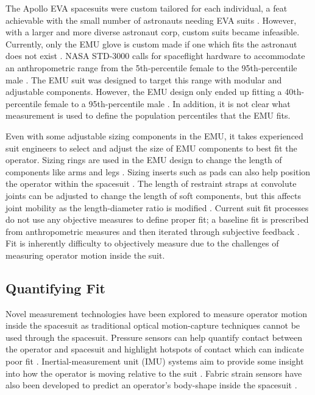 \documentclass[defaultstyle,11pt]{comps}
\begin{document}
The Apollo EVA spacesuits were custom tailored for each individual, a feat achievable with the small number of astronauts needing EVA suits \citep{Harris2001}.
However, with a larger and more diverse astronaut corp, custom suits became infeasible.
Currently, only the EMU glove is custom made if one which fits the astronaut does not exist \citep{Chappell2017}.
NASA STD-3000 calls for spaceflight hardware to accommodate an anthropometric range from the 5th-percentile female to the 95th-percentile male \citep{NASA1995}.
The EMU suit was designed to target this range with modular and adjustable components.
However, the EMU design only ended up fitting a 40th-percentile female to a 95th-percentile male \citep{Kim2019}.
In addition, it is not clear what measurement is used to define the population percentiles that the EMU fits.

Even with some adjustable sizing components in the EMU, it takes experienced suit engineers to select and adjust the size of EMU components to best fit the operator.
Sizing rings are used in the EMU design to change the length of components like arms and legs \citep{Harris2001}.
Sizing inserts such as pads can also help position the operator within the spacesuit \citep{Chappell2017}.
The length of restraint straps at convolute joints can be adjusted to change the length of soft components, but this affects joint mobility as the length-diameter ratio is modified \citep{Harris2001}.
Current suit fit processes do not use any objective measures to define proper fit; a baseline fit is prescribed from anthropometric measures and then iterated through subjective feedback \citep{Fineman2017}.
Fit is inherently difficulty to objectively measure due to the challenges of measuring operator motion inside the suit.

\hypertarget{quantifying-fit}{%
\subsection{Quantifying Fit}\label{quantifying-fit}}

Novel measurement technologies have been explored to measure operator motion inside the spacesuit as traditional optical motion-capture techniques cannot be used through the spacesuit.
Pressure sensors can help quantify contact between the operator and spacesuit and highlight hotspots of contact which can indicate poor fit \citep{Anderson2014, Anderson2015, Anderson2015b}.
Inertial-measurement unit (IMU) systems aim to provide some insight into how the operator is moving relative to the suit \citep{Bertrand2014, Fineman2018, Shen2019}.
Fabric strain sensors have also been developed to predict an operator's body-shape inside the spacesuit \citep{Kim2019}.
\end{document}
